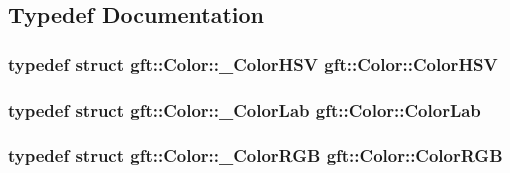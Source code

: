 \subsection{Typedef Documentation}
\hypertarget{namespacegft_1_1Color_aed1455cdf0cb4b82a52036558c79c7ec}{
\subsubsection[{Color\-H\-S\-V}]{\setlength{\rightskip}{0pt plus 5cm}typedef struct {\bf gft\-::\-Color\-::\-\_\-\-Color\-H\-S\-V}  {\bf gft\-::\-Color\-::\-Color\-H\-S\-V}}}\label{namespacegft_1_1Color_aed1455cdf0cb4b82a52036558c79c7ec}
\hypertarget{namespacegft_1_1Color_ad20d597f5459319babaaef54b8a2090d}{
\subsubsection[{Color\-Lab}]{\setlength{\rightskip}{0pt plus 5cm}typedef struct {\bf gft\-::\-Color\-::\-\_\-\-Color\-Lab}  {\bf gft\-::\-Color\-::\-Color\-Lab}}}\label{namespacegft_1_1Color_ad20d597f5459319babaaef54b8a2090d}
\hypertarget{namespacegft_1_1Color_ac5d6eeb0a5908559d77e2a007419b5f0}{
\subsubsection[{Color\-R\-G\-B}]{\setlength{\rightskip}{0pt plus 5cm}typedef struct {\bf gft\-::\-Color\-::\-\_\-\-Color\-R\-G\-B}  {\bf gft\-::\-Color\-::\-Color\-R\-G\-B}}}\label{namespacegft_1_1Color_ac5d6eeb0a5908559d77e2a007419b5f0}


